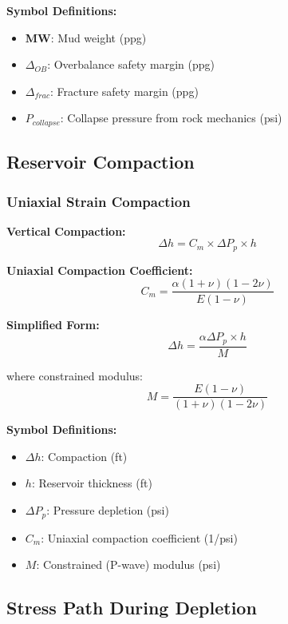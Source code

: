 \documentclass[11pt,a4paper]{article}
\newcommand{\symitem}[2]{\item \textbf{#1}: #2}
\begin{document}
\textbf{Symbol Definitions:}
\begin{itemize}[leftmargin=2cm]
\symitem{MW}{Mud weight (ppg)}
\symitem{$\Delta_{OB}$}{Overbalance safety margin (ppg)}
\symitem{$\Delta_{frac}$}{Fracture safety margin (ppg)}
\symitem{$P_{collapse}$}{Collapse pressure from rock mechanics (psi)}
\end{itemize}

\subsection{Reservoir Compaction}

\subsubsection{Uniaxial Strain Compaction}

\begin{tcolorbox}[colback=formulabox,colframe=black!75]
\textbf{Vertical Compaction:}
\begin{equation}
\Delta h = C_m \times \Delta P_p \times h
\end{equation}

\textbf{Uniaxial Compaction Coefficient:}
\begin{equation}
C_m = \frac{\alpha (1+\nu)(1-2\nu)}{E(1-\nu)}
\end{equation}

\textbf{Simplified Form:}
\begin{equation}
\Delta h = \frac{\alpha \Delta P_p \times h}{M}
\end{equation}

where constrained modulus:
\begin{equation}
M = \frac{E(1-\nu)}{(1+\nu)(1-2\nu)}
\end{equation}
\end{tcolorbox}

\textbf{Symbol Definitions:}
\begin{itemize}[leftmargin=2cm]
\symitem{$\Delta h$}{Compaction (ft)}
\symitem{$h$}{Reservoir thickness (ft)}
\symitem{$\Delta P_p$}{Pressure depletion (psi)}
\symitem{$C_m$}{Uniaxial compaction coefficient (1/psi)}
\symitem{$M$}{Constrained (P-wave) modulus (psi)}
\end{itemize}

\subsection{Stress Path During Depletion}
\end{document}
